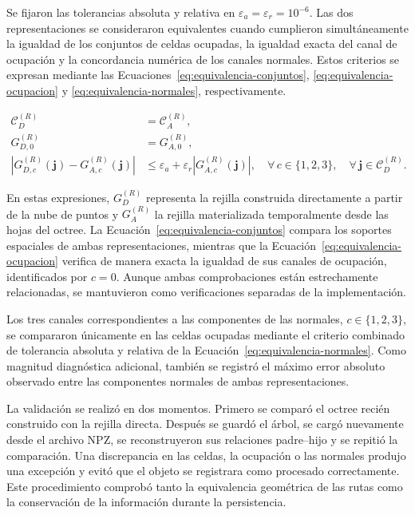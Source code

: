 Se fijaron las tolerancias absoluta y relativa en
$\varepsilon_a=\varepsilon_r=10^{-6}$. Las dos representaciones se
consideraron equivalentes cuando cumplieron simultáneamente la igualdad
de los conjuntos de celdas ocupadas, la igualdad exacta del canal de
ocupación y la concordancia numérica de los canales normales. Estos
criterios se expresan mediante las
Ecuaciones~\eqref{eq:equivalencia-conjuntos},
\eqref{eq:equivalencia-ocupacion} y
\eqref{eq:equivalencia-normales}, respectivamente.

\begin{subequations}\label{eq:criterios-equivalencia}
\begin{align}
\mathcal C_D^{(R)}
&=
\mathcal C_A^{(R)},
\label{eq:equivalencia-conjuntos}\\
G_{D,0}^{(R)}
&=
G_{A,0}^{(R)},
\label{eq:equivalencia-ocupacion}\\
\left|
G_{D,c}^{(R)}(\mathbf j)
-
G_{A,c}^{(R)}(\mathbf j)
\right|
&\leq
\varepsilon_a
+
\varepsilon_r
\left|
G_{A,c}^{(R)}(\mathbf j)
\right|,
\quad
\forall\,c\in\{1,2,3\},
\quad
\forall\,\mathbf j\in\mathcal C_D^{(R)}.
\label{eq:equivalencia-normales}
\end{align}
\end{subequations}

En estas expresiones, $G_D^{(R)}$ representa la rejilla construida
directamente a partir de la nube de puntos y $G_A^{(R)}$ la rejilla
materializada temporalmente desde las hojas del octree. La
Ecuación~\eqref{eq:equivalencia-conjuntos} compara los soportes
espaciales de ambas representaciones, mientras que la
Ecuación~\eqref{eq:equivalencia-ocupacion} verifica de manera exacta
la igualdad de sus canales de ocupación, identificados por $c=0$.
Aunque ambas comprobaciones están estrechamente relacionadas, se
mantuvieron como verificaciones separadas de la implementación.

Los tres canales correspondientes a las componentes de las normales,
$c\in\{1,2,3\}$, se compararon únicamente en las celdas ocupadas
mediante el criterio combinado de tolerancia absoluta y relativa de la
Ecuación~\eqref{eq:equivalencia-normales}. Como magnitud diagnóstica
adicional, también se registró el máximo error absoluto observado entre
las componentes normales de ambas representaciones.

La validación se realizó en dos momentos. Primero se comparó el octree recién construido con la rejilla directa. Después se guardó el árbol, se cargó nuevamente desde el archivo NPZ, se reconstruyeron sus relaciones padre--hijo y se repitió la comparación. Una discrepancia en las celdas, la ocupación o las normales produjo una excepción y evitó que el objeto se registrara como procesado correctamente. Este procedimiento comprobó tanto la equivalencia geométrica de las rutas como la conservación de la información durante la persistencia.

